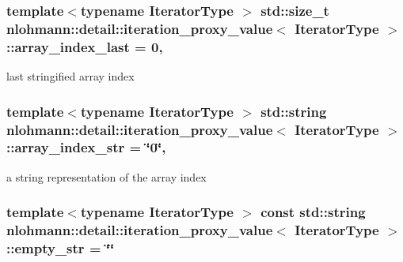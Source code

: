 \subsubsection[{\texorpdfstring{array\+\_\+index\+\_\+last}{array_index_last}}]{\setlength{\rightskip}{0pt plus 5cm}template$<$typename Iterator\+Type $>$ std\+::size\+\_\+t {\bf nlohmann\+::detail\+::iteration\+\_\+proxy\+\_\+value}$<$ Iterator\+Type $>$\+::array\+\_\+index\+\_\+last = 0\hspace{0.3cm}{\ttfamily [mutable]}, {\ttfamily [private]}}\hypertarget{classnlohmann_1_1detail_1_1iteration__proxy__value_aac6e7cc0c17242a0a42c14d1e714747c}{}\label{classnlohmann_1_1detail_1_1iteration__proxy__value_aac6e7cc0c17242a0a42c14d1e714747c}


last stringified array index 

\subsubsection[{\texorpdfstring{array\+\_\+index\+\_\+str}{array_index_str}}]{\setlength{\rightskip}{0pt plus 5cm}template$<$typename Iterator\+Type $>$ {\bf std\+::string} {\bf nlohmann\+::detail\+::iteration\+\_\+proxy\+\_\+value}$<$ Iterator\+Type $>$\+::array\+\_\+index\+\_\+str = \char`\"{}0\char`\"{}\hspace{0.3cm}{\ttfamily [mutable]}, {\ttfamily [private]}}\hypertarget{classnlohmann_1_1detail_1_1iteration__proxy__value_a434324f7bed312c5b4aaedd3c6664e28}{}\label{classnlohmann_1_1detail_1_1iteration__proxy__value_a434324f7bed312c5b4aaedd3c6664e28}


a string representation of the array index 

\subsubsection[{\texorpdfstring{empty\+\_\+str}{empty_str}}]{\setlength{\rightskip}{0pt plus 5cm}template$<$typename Iterator\+Type $>$ const {\bf std\+::string} {\bf nlohmann\+::detail\+::iteration\+\_\+proxy\+\_\+value}$<$ Iterator\+Type $>$\+::empty\+\_\+str = \char`\"{}\char`\"{}\hspace{0.3cm}{\ttfamily [private]}}\hypertarget{classnlohmann_1_1detail_1_1iteration__proxy__value_af970916a35c40e75e2317a6a08370324}{}\label{classnlohmann_1_1detail_1_1iteration__proxy__value_af970916a35c40e75e2317a6a08370324}


